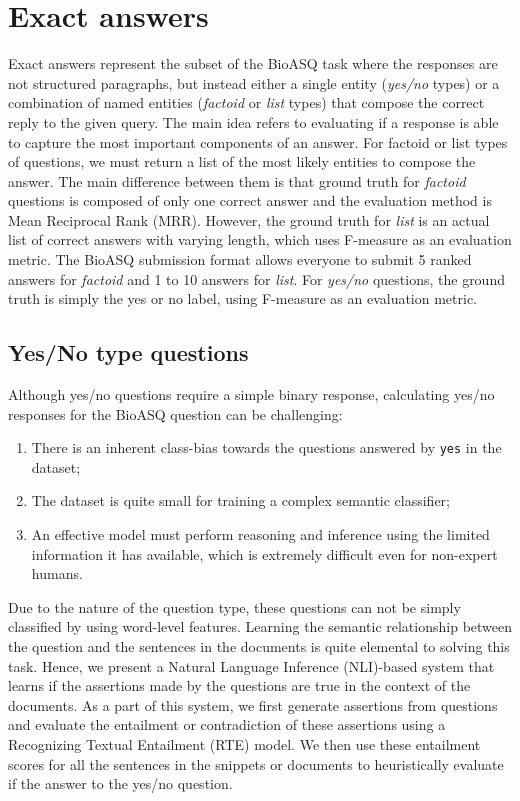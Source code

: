 \documentclass[11pt,a4paper]{article}
\begin{document}
\section{Exact answers}
\label{approach2}
Exact answers represent the subset of the BioASQ task where the responses are not structured paragraphs, but instead either a single entity (\textit{yes/no} types) or a combination of named entities (\textit{factoid} or \textit{list} types) that compose the correct reply to the given query. The main idea refers to evaluating if a response is able to capture the most important components of an answer. For factoid or list types of questions, we must return a list of the most likely entities to compose the answer. The main difference between them is that ground truth for \textit{factoid} questions is composed of only one correct answer and the evaluation method is Mean Reciprocal Rank (MRR). However, the ground truth for \textit{list} is an actual list of correct answers with varying length, which uses F-measure as an evaluation metric. The BioASQ submission format allows everyone to submit 5 ranked answers for \textit{factoid} and 1 to 10 answers for \textit{list}. For \textit{yes/no} questions, the ground truth is simply the yes or no label, using F-measure as an evaluation metric.


\subsection{Yes/No type questions}

Although yes/no questions require a simple binary response, calculating yes/no responses for the BioASQ question can be challenging: 
\begin{enumerate}
    \item There is an inherent class-bias towards the questions answered by \texttt{yes} in the dataset;
    \item The dataset is quite small for training a complex semantic classifier;
    \item An effective model must perform  reasoning and inference using the limited information it has available, which is extremely difficult even for non-expert humans.
\end{enumerate}

Due to the nature of the question type, these questions can not be simply classified by using word-level features. Learning the semantic relationship between the question and the sentences in the documents is quite elemental to solving this task. Hence, we present a Natural Language Inference (NLI)-based system that learns if the assertions made by the questions are true in the context of the documents. As a part of this system, we first generate assertions from questions and evaluate the entailment or contradiction of these assertions using a Recognizing Textual Entailment (RTE) model. We then use these entailment scores for all the sentences in the snippets or documents to heuristically evaluate if the answer to the yes/no question.
\end{document}
